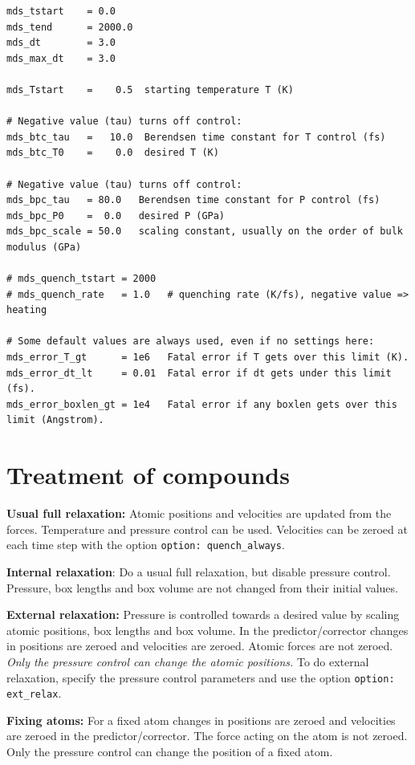 \documentclass[a4paper,12pt,pdftex,onecolumn]{article}
\begin{document}
\begin{Verbatim}[fontsize=\relsize{-1},frame=single]
mds_tstart    = 0.0
mds_tend      = 2000.0
mds_dt        = 3.0
mds_max_dt    = 3.0

mds_Tstart    =    0.5  starting temperature T (K)

# Negative value (tau) turns off control:
mds_btc_tau   =   10.0  Berendsen time constant for T control (fs)
mds_btc_T0    =    0.0  desired T (K)

# Negative value (tau) turns off control:
mds_bpc_tau   = 80.0   Berendsen time constant for P control (fs)
mds_bpc_P0    =  0.0   desired P (GPa)
mds_bpc_scale = 50.0   scaling constant, usually on the order of bulk modulus (GPa)

# mds_quench_tstart = 2000
# mds_quench_rate   = 1.0   # quenching rate (K/fs), negative value => heating

# Some default values are always used, even if no settings here:
mds_error_T_gt      = 1e6   Fatal error if T gets over this limit (K).
mds_error_dt_lt     = 0.01  Fatal error if dt gets under this limit (fs).
mds_error_boxlen_gt = 1e4   Fatal error if any boxlen gets over this limit (Angstrom).

\end{Verbatim}




\section{Treatment of compounds}
\label{sec:comptreat}

\textbf{Usual full relaxation:} Atomic positions and
velocities are updated from the forces.
Temperature and pressure control can be used.
Velocities can be zeroed at each time step with the option \verb+option: quench_always+.

\textbf{Internal relaxation}: Do a usual full relaxation, but disable pressure control.
Pressure, box lengths and box volume are not changed from their initial values.

\textbf{External relaxation:} Pressure is controlled towards a desired value by scaling
atomic positions, box lengths and box volume.
In the predictor/corrector changes in positions are zeroed and velocities are zeroed.
Atomic forces are not zeroed.
\textit{Only the pressure control can change the atomic positions.}
To do external relaxation, specify the pressure control parameters and use the
option \verb+option: ext_relax+.

\textbf{Fixing atoms:} For a fixed atom
changes in positions are zeroed and velocities are zeroed
in the predictor/corrector.
The force acting on the atom is not zeroed.
Only the pressure control can change the position of a fixed atom.
\end{document}
